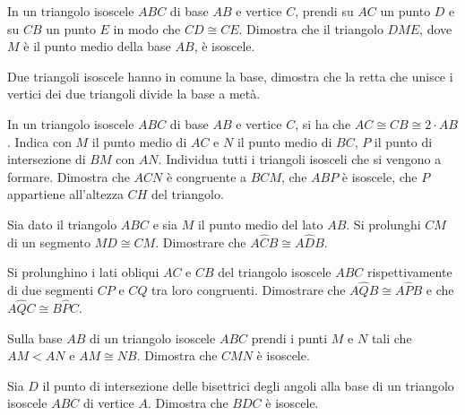 \begin{multicols}{2}
\begin{esercizio}
\label{ese:2.45}
In un triangolo isoscele $ABC$ di base $AB$ e vertice $C$, prendi su $AC$ un punto $D$ e su $CB$ un punto $E$ in modo che $CD\cong CE$. Dimostra che il triangolo $DME$, dove $M$ è il punto medio della base $AB$, è isoscele.
\end{esercizio}

\begin{esercizio}
\label{ese:2.46}
Due triangoli isoscele hanno in comune la base, dimostra che la retta che unisce i vertici dei due triangoli divide la base a metà.
\end{esercizio}

\begin{esercizio}
\label{ese:2.47}
In un triangolo isoscele $ABC$ di base $AB$ e vertice $C$, si ha che $AC\cong CB\cong 2\cdot AB$. Indica con $M$ il punto medio di $AC$ e $N$ il punto medio di $BC$, $P$ il punto di intersezione di $BM$ con $AN$. Individua tutti i triangoli isosceli che si vengono a formare. Dimostra che $ACN$ è congruente a $BCM$, che $ABP$ è isoscele, che $P$ appartiene all'altezza $CH$ del triangolo.
\end{esercizio}

\begin{esercizio}
\label{ese:2.48}
Sia dato il triangolo $ABC$ e sia $M$ il punto medio del lato $AB$. Si prolunghi $CM$ di un segmento $MD\cong CM$. Dimostrare che $A\widehat{C}B\cong A\widehat{D}B$.
\end{esercizio}

\begin{esercizio}
\label{ese:2.49}
Si prolunghino i lati obliqui $AC$ e $CB$ del triangolo isoscele $ABC$ rispettivamente di due segmenti $CP$ e $CQ$ tra loro congruenti. Dimostrare che $A\widehat{Q}B\cong A\widehat{P}B$ e che $A\widehat{Q}C\cong B\widehat{P}C$.
\end{esercizio}

\begin{esercizio}
\label{ese:2.50}
Sulla base $AB$ di un triangolo isoscele $ABC$ prendi i punti $M$ e $N$ tali che $AM<AN$ e $AM\cong NB$. Dimostra che $CMN$ è isoscele.
\end{esercizio}

\begin{esercizio}
\label{ese:2.51}
Sia $D$ il punto di intersezione delle bisettrici degli angoli alla base di un triangolo isoscele $ABC$ di vertice $A$. Dimostra che $BDC$ è isoscele.
\end{esercizio}


\end{multicols}
